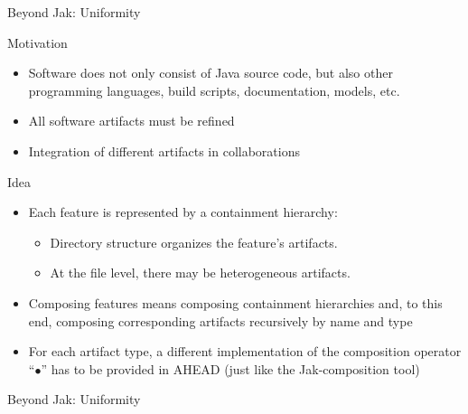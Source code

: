 \begin{frame}{Beyond Jak: Uniformity}
	\begin{fancycolumns}[widths={35,65},animation=none]
		\begin{note}{Motivation}
			\begin{itemize}
				\item Software does not only consist of Java source code, but also other programming languages, build scripts, documentation, models, etc.
				\item All software artifacts must be refined 
				\item Integration of different artifacts in collaborations
			\end{itemize}
		\end{note}
	\nextcolumn
		\begin{definition}{Idea}
			\begin{itemize}
				\item Each feature is represented by a containment hierarchy: 
				\begin{itemize}
					\item Directory structure organizes the feature's artifacts.
					\item At the file level, there may be heterogeneous artifacts.
				\end{itemize}
				\item Composing features means composing containment hierarchies and, to this end, composing corresponding artifacts recursively by name and type
				\item For each artifact type, a different implementation of the composition operator ``$\bullet$'' has to be provided in AHEAD (just like the Jak-composition tool)
			\end{itemize}
		\end{definition}
	\end{fancycolumns}
\end{frame}

\begin{frame}{Beyond Jak: Uniformity}
	\begin{exampletight}{}
		\centering
	\end{exampletight}
\end{frame}

